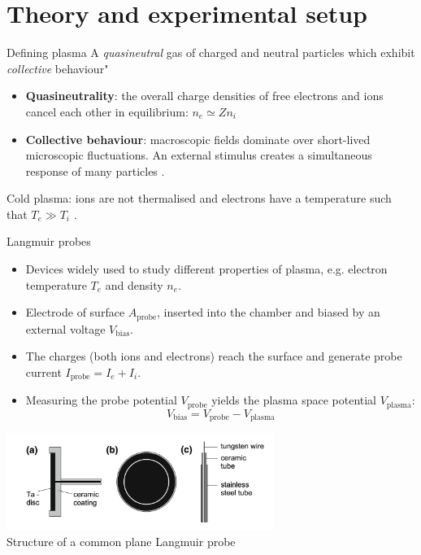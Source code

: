 \documentclass[10pt]{beamer}
\newcommand{\probecurrent}[0]{\ensuremath{I_{\mathrm{probe}}}}
\newcommand{\biasvoltage}{\ensuremath{V_{\mathrm{bias}}}}
\newcommand{\probevoltage}{\ensuremath{V_{\mathrm{probe}}}}
\newcommand{\plasmavoltage}{\ensuremath{V_{\mathrm{plasma}}}}
\begin{document}
\section{Theory and experimental setup}
\begin{frame}{Defining plasma}
    A \emph{quasineutral} gas of charged and neutral particles which exhibit \emph{collective} behaviour" 
    \vspace{0.5cm}
    \begin{itemize}
        \item \textbf{Quasineutrality}: the overall charge densities of free electrons and ions cancel each other in equilibrium: 
            $n_e \simeq Z n_i$ 

        \item \textbf{Collective behaviour}: macroscopic fields dominate over short-lived microscopic fluctuations.
            An external stimulus creates a simultaneous response of many particles .
    \end{itemize}
    \vspace{0.5cm}
    Cold plasma: ions are not thermalised and electrons have a temperature such that $T_e \gg T_i$ .
\end{frame}


\begin{frame}{Langmuir probes}
    \vspace{0.2cm}
    \begin{itemize}
        \item Devices widely used to study different properties of plasma, e.g. electron temperature $T_e$ and density $n_e$.
        
        \item Electrode of surface $A_{\mathrm{probe}}$, inserted into the chamber and biased by an external voltage $\biasvoltage$.
        \item The charges (both ions and electrons) reach the surface and generate probe current $\probecurrent = I_e + I_i$.
        \item Measuring the probe potential $\probevoltage$ yields the plasma space potential $\plasmavoltage$:
        \begin{equation*}
            \biasvoltage= \probevoltage - \plasmavoltage
        \end{equation*}
    \end{itemize}

    \begin{center}
        \includegraphics[width=0.65\textwidth]{../figures/langmuir_probe.png}
        \\
        \small Structure of a common plane Langmuir probe\, 
    \end{center}
\end{frame}
\end{document}
